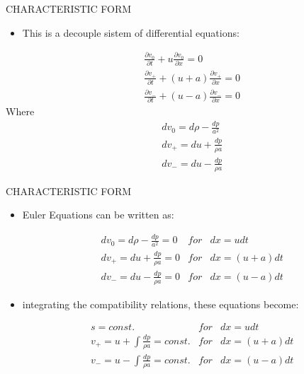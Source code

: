\documentclass{beamer}
\begin{document}
\begin{frame}{CHARACTERISTIC FORM}
  \begin{itemize}
   \item This is a decouple sistem of differential equations:
  \end{itemize}
  \begin{eqnarray}
    &&\frac{\partial{v_0}}{\partial{t}}+u\frac{\partial{v_0}}{\partial{x}}=0\\
    &&\frac{\partial{v_+}}{\partial{t}}+(u+a)\frac{\partial{v_+}}{\partial{x}}=0\\
    &&\frac{\partial{v_-}}{\partial{t}}+(u-a)\frac{\partial{v_-}}{\partial{x}}=0
  \end{eqnarray}
Where
  \begin{eqnarray}
    &&dv_0=d\rho-\frac{dp}{a^2}\\
    &&dv_+=du+\frac{dp}{\rho{a}}\\
    &&dv_-=du-\frac{dp}{\rho{a}}
  \end{eqnarray}
\end{frame}

\begin{frame}{CHARACTERISTIC FORM}
  \begin{itemize}
   \item Euler Equations can be written as:
  \end{itemize}
  \begin{equation}
    \begin{matrix}
    &&dv_0=d\rho-\frac{dp}{a^2}=0 & for & dx=udt\\ 
    &&dv_+=du+\frac{dp}{\rho{a}}=0 & for & dx=(u+a)dt\\ 
    &&dv_-=du-\frac{dp}{\rho{a}}=0 & for & dx=(u-a)dt
    \end{matrix}
  \end{equation}
  \begin{itemize}
   \item integrating the compatibility relations, these equations become:
  \end{itemize}
  \begin{equation}
    \begin{matrix}
    &&s=const. & for & dx=udt\\ 
    &&v_+=u+\int\frac{dp}{\rho{a}}=const. & for & dx=(u+a)dt\\ 
    &&v_-=u-\int\frac{dp}{\rho{a}}=const. & for & dx=(u-a)dt
    \end{matrix}
  \end{equation}
\end{frame}
\end{document}
